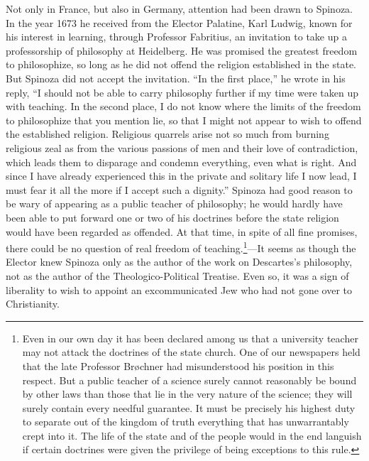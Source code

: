 \documentclass[12pt]{book}
\newcommand{\opage}[1]{\marginnote{\footnotesize\textit{[#1]}}}
\begin{document}
Not only in France, but also in Germany, attention had been drawn to Spinoza. In the
year 1673 he received from the Elector Palatine, Karl Ludwig, known for his interest
in learning, through Professor Fabritius, an invitation to take up a professorship of
philosophy at Heidelberg. He was promised the greatest freedom to philosophize, so
long as he did not offend the religion established in the state. But Spinoza did not
accept the invitation. ``In the first place,'' he wrote in his reply, ``I should not
be able to carry philosophy further if my time were taken up with teaching. In the
second place, I do not know where the limits of the freedom to philosophize that you
mention lie, so that I might not appear to wish to offend the established religion.
Religious quarrels arise not so much from burning religious zeal as from the various
passions of men and their love of contradiction, which leads them to disparage and
condemn everything, even what is right. And since I have already experienced this in
the private and solitary life I now lead, I must fear it all the more if I accept such
a dignity.'' Spinoza had good reason to be wary of appearing as a public teacher of
philosophy; he would hardly have been able to put forward one or two of his doctrines
before the state religion would have been regarded as offended. At that time, in spite
of all fine promises, there could be no question of \opage{35}real freedom of
teaching.\footnote{Even in our own day it has been declared among us that a university
teacher may not attack the doctrines of the state church. One of our newspapers held
that the late Professor Brøchner had misunderstood his position in this respect. But a
public teacher of a science surely cannot reasonably be bound by other laws than those
that lie in the very nature of the science; they will surely contain every needful
guarantee. It must be precisely his highest duty to separate out of the kingdom of
truth everything that has unwarrantably crept into it. The life of the state and of
the people would in the end languish if certain doctrines were given the privilege of
being exceptions to this rule.}---It seems as though the Elector knew Spinoza only as
the author of the work on Descartes's philosophy, not as the author of the
Theologico-Political Treatise. Even so, it was a sign of liberality to wish to appoint
an excommunicated Jew who had not gone over to Christianity.
\end{document}
